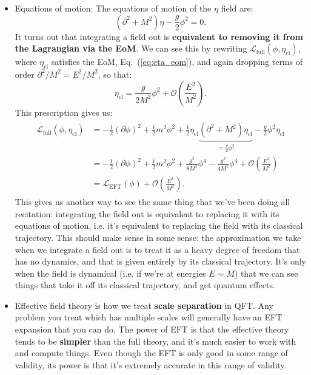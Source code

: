 \documentclass[12pt, oneside]{article}   	%
\theoremstyle{definition}
\begin{document}
\begin{itemize}
	\item Equations of motion: The equations of motion of the $\eta$ field are:
	\begin{equation}
		(\partial^2 + M^2)\eta - \frac{g}{2} \phi^2 = 0. \label{eq:eta_eom}
	\end{equation}
	It turns out that integrating a field out is \textbf{equivalent to removing it from the Lagrangian via the EoM}. We can see this by rewriting $\mathcal L_\mathrm{full}(\phi, \eta_\mathrm{cl})$, where $\eta_\mathrm{cl}$ satisfies the EoM, Eq.~(\ref{eq:eta_eom}), and again dropping terms of order $\partial^2 / M^2 = E^2 / M^2$, so that:
	\begin{equation}
		\eta_\mathrm{cl} = \frac{g}{2M^2} \phi^2 + \mathcal O\left(\frac{E^2}{M^2}\right).
	\end{equation}
	This prescription gives us:
	\begin{align} \begin{split}
		\mathcal L_\mathrm{full}(\phi, \eta_\mathrm{cl}) &= -\frac{1}{2} (\partial\phi)^2 + \frac{1}{2} m^2 \phi^2 + \frac{1}{2} \eta_{\mathrm{cl}} \underbrace{(\partial^2 + M^2) \eta_\mathrm{cl}}_{=\frac{g}{2}\phi^2} - \frac{g}{2} \phi^2\eta_\mathrm{cl} \\
		&= -\frac{1}{2} (\partial\phi)^2 + \frac{1}{2} m^2 \phi^2 + \frac{g^2}{8 M^2} \phi^4 - \frac{g^2}{4 M^2} \phi^4 + \mathcal O\left(\frac{E^2}{M^2}\right) \\
		&= \mathcal L_\mathrm{EFT}(\phi) + \mathcal O\left(\frac{E^2}{M^2}\right).
	\end{split} \end{align}
	This gives us another way to see the same thing that we've been doing all recitation: integrating the field out is equivalent to replacing it with its equations of motion, i.e. it's equivalent to replacing the field with its classical trajectory. This should make sense in some sense: the approximation we take when we integrate a field out is to treat it as a heavy degree of freedom that has no dynamics, and that is given entirely by its classical trajectory. It's only when the field is dynamical (i.e. if we're at energies $E\sim M$) that we can see things that take it off its classical trajectory, and get quantum effects. 
	
	\item Effective field theory is how we treat \textbf{scale separation} in QFT. Any problem you treat which has multiple scales will generally have an EFT expansion that you can do. The power of EFT is that the effective theory tends to be \textbf{simpler} than the full theory, and it's much easier to work with and compute things. Even though the EFT is only good in some range of validity, its power is that it's extremely accurate in this range of validity. 
	

\end{itemize}
\end{document}
